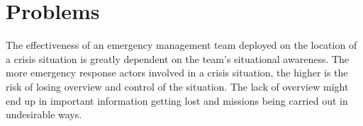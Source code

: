\chapter{Problems}
\label{chap:problems}
The effectiveness of an emergency management team deployed on the location of a crisis situation is greatly dependent on the team's situational awareness. The more emergency response actors involved in a crisis situation, the higher is the risk of losing overview and control of the situation. The lack of overview might end up in important information getting lost and missions being carried out in undesirable ways. 

